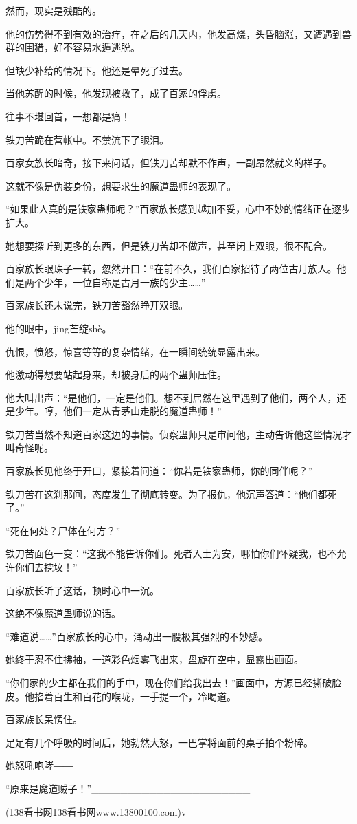 \begin{this_body}
然而，现实是残酷的。

他的伤势得不到有效的治疗，在之后的几天内，他发高烧，头昏脑涨，又遭遇到兽群的围猎，好不容易水遁逃脱。

但缺少补给的情况下。他还是晕死了过去。

当他苏醒的时候，他发现被救了，成了百家的俘虏。

往事不堪回首，一想都是痛！

铁刀苦跪在营帐中。不禁流下了眼泪。

百家女族长暗奇，接下来问话，但铁刀苦却默不作声，一副昂然就义的样子。

这就不像是伪装身份，想要求生的魔道蛊师的表现了。

“如果此人真的是铁家蛊师呢？”百家族长感到越加不妥，心中不妙的情绪正在逐步扩大。

她想要探听到更多的东西，但是铁刀苦却不做声，甚至闭上双眼，很不配合。

百家族长眼珠子一转，忽然开口：“在前不久，我们百家招待了两位古月族人。他们是两个少年，一位自称是古月一族的少主……”

百家族长还未说完，铁刀苦豁然睁开双眼。

他的眼中，jing芒绽shè。

仇恨，愤怒，惊喜等等的复杂情绪，在一瞬间统统显露出来。

他激动得想要站起身来，却被身后的两个蛊师压住。

他大叫出声：“是他们，一定是他们。想不到居然在这里遇到了他们，两个人，还是少年。哼，他们一定从青茅山走脱的魔道蛊师！”

铁刀苦当然不知道百家这边的事情。侦察蛊师只是审问他，主动告诉他这些情况才叫奇怪呢。

百家族长见他终于开口，紧接着问道：“你若是铁家蛊师，你的同伴呢？”

铁刀苦在这刹那间，态度发生了彻底转变。为了报仇，他沉声答道：“他们都死了。”

“死在何处？尸体在何方？”

铁刀苦面色一变：“这我不能告诉你们。死者入土为安，哪怕你们怀疑我，也不允许你们去挖坟！”

百家族长听了这话，顿时心中一沉。

这绝不像魔道蛊师说的话。

“难道说……”百家族长的心中，涌动出一股极其强烈的不妙感。

她终于忍不住拂袖，一道彩色烟雾飞出来，盘旋在空中，显露出画面。

“你们家的少主都在我们的手中，现在你们给我出去！”画面中，方源已经撕破脸皮。他掐着百生和百花的喉咙，一手提一个，冷喝道。

百家族长呆愣住。

足足有几个呼吸的时间后，她勃然大怒，一巴掌将面前的桌子拍个粉碎。

她怒吼咆哮――

“原来是魔道贼子！”\_\_\_\_\_\_\_\_\_\_\_\_\_\_\_\_\_\_\_\_\_\_

(138看书网138看书网www.13800100.com)v

\end{this_body}

